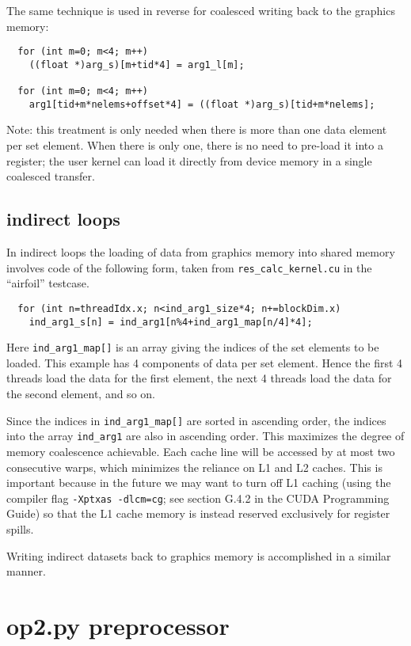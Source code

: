 \documentclass[11pt]{article}
\begin{document}
The same technique is used in reverse for coalesced writing back to the
graphics memory:
\begin{verbatim}
  for (int m=0; m<4; m++)
    ((float *)arg_s)[m+tid*4] = arg1_l[m];

  for (int m=0; m<4; m++)
    arg1[tid+m*nelems+offset*4] = ((float *)arg_s)[tid+m*nelems];
\end{verbatim}

Note: this treatment is only needed when there is more than one data element
per set element.  When there is only one, there is no need to pre-load it into
a register; the user kernel can load it directly from device memory in a
single coalesced transfer.

\newpage
\subsection{indirect loops}

In indirect loops the loading of data from graphics memory into shared
memory involves code of the following form, taken from
{\tt res\_calc\_kernel.cu} in the ``airfoil'' testcase.
\begin{verbatim}
  for (int n=threadIdx.x; n<ind_arg1_size*4; n+=blockDim.x)
    ind_arg1_s[n] = ind_arg1[n%4+ind_arg1_map[n/4]*4];
\end{verbatim}
Here \verb!ind_arg1_map[]! is an array giving the indices of the set
elements to be loaded.  This example has 4 components of data per set
element.  Hence the first 4 threads load the data for the first element,
the next 4 threads load the data for the second element, and so on.

Since the indices in \verb!ind_arg1_map[]! are sorted in ascending order,
the indices into the array \verb!ind_arg1! are also in ascending order.
This maximizes the degree of memory coalescence achievable. Each cache line
will be accessed by at most two consecutive warps, which minimizes the
reliance on L1 and L2 caches. This is important because in the future we
may want to turn off L1 caching (using the compiler flag {\tt -Xptxas -dlcm=cg};
see section G.4.2 in the CUDA Programming Guide) so that the L1 cache
memory is instead reserved exclusively for register spills.

Writing indirect datasets back to graphics memory is accomplished in a
similar manner.

\newpage

\section{op2.py preprocessor}
\end{document}
